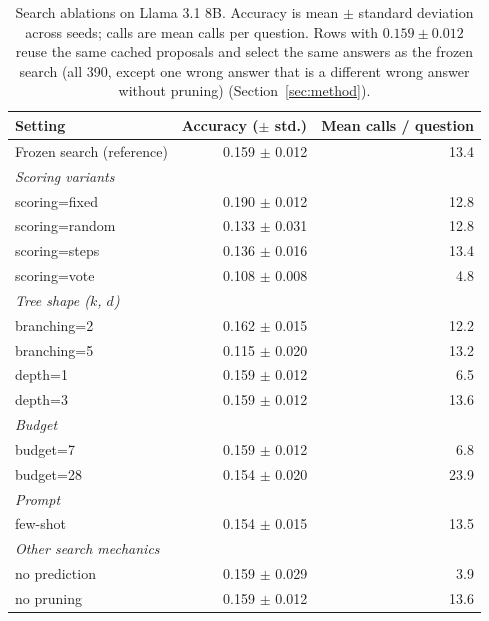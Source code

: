 \begin{table}[ht]
\centering
\caption{Search ablations on Llama 3.1 8B. Accuracy is mean $\pm$ standard deviation across seeds; calls are mean calls per question. Rows with $0.159 \pm 0.012$ reuse the same cached proposals and select the same answers as the frozen search (all 390, except one wrong answer that is a different wrong answer without pruning) (Section~\ref{sec:method}).}
\label{tab:ablations}
\begin{tabular}{lrr}
\toprule
Setting & Accuracy ($\pm$ std.) & Mean calls / question \\
\midrule
Frozen search (reference) & 0.159 $\pm$ 0.012 & 13.4 \\
\multicolumn{3}{l}{\textit{Scoring variants}} \\
scoring=fixed & 0.190 $\pm$ 0.012 & 12.8 \\
scoring=random & 0.133 $\pm$ 0.031 & 12.8 \\
scoring=steps & 0.136 $\pm$ 0.016 & 13.4 \\
scoring=vote & 0.108 $\pm$ 0.008 & 4.8 \\
\multicolumn{3}{l}{\textit{Tree shape ($k$, $d$)}} \\
branching=2 & 0.162 $\pm$ 0.015 & 12.2 \\
branching=5 & 0.115 $\pm$ 0.020 & 13.2 \\
depth=1 & 0.159 $\pm$ 0.012 & 6.5 \\
depth=3 & 0.159 $\pm$ 0.012 & 13.6 \\
\multicolumn{3}{l}{\textit{Budget}} \\
budget=7 & 0.159 $\pm$ 0.012 & 6.8 \\
budget=28 & 0.154 $\pm$ 0.020 & 23.9 \\
\multicolumn{3}{l}{\textit{Prompt}} \\
few-shot & 0.154 $\pm$ 0.015 & 13.5 \\
\multicolumn{3}{l}{\textit{Other search mechanics}} \\
no prediction & 0.159 $\pm$ 0.029 & 3.9 \\
no pruning & 0.159 $\pm$ 0.012 & 13.6 \\
\bottomrule
\end{tabular}
\end{table}
